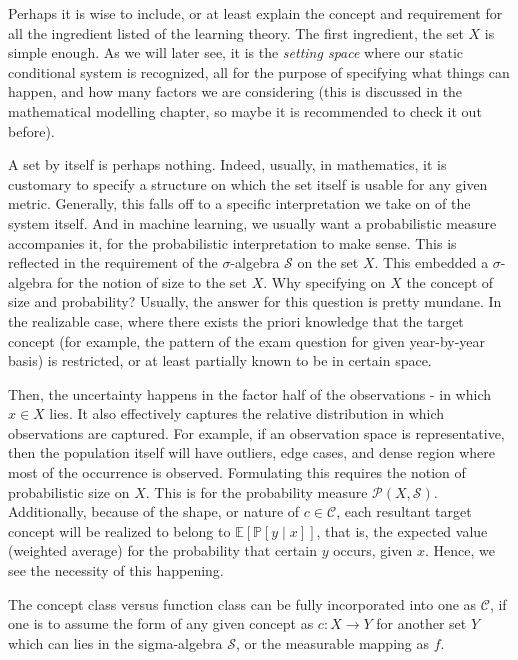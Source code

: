 \begin{note}
    Perhaps it is wise to include, or at least explain the concept and requirement for all the ingredient listed of the learning theory. The first ingredient, the set $X$ is simple enough. As we will later see, it is the \textit{setting space} where our static conditional system is recognized, all for the purpose of specifying what things can happen, and how many factors we are considering (this is discussed in the mathematical modelling chapter, so maybe it is recommended to check it out before). 

    A set by itself is perhaps nothing. Indeed, usually, in mathematics, it is customary to specify a structure on which the set itself is usable for any given metric. Generally, this falls off to a specific interpretation we take on of the system itself. And in machine learning, we usually want a probabilistic measure accompanies it, for the probabilistic interpretation to make sense. This is reflected in the requirement of the $\sigma$-algebra $\mathcal{S}$ on the set $X$. This embedded a $\sigma$-algebra for the notion of size to the set $X$. Why specifying on $X$ the concept of size and probability? Usually, the answer for this question is pretty mundane. In the realizable case, where there exists the priori knowledge that the target concept (for example, the pattern of the exam question for given year-by-year basis) is restricted, or at least partially known to be in certain space. 
    
    Then, the uncertainty happens in the factor half of the observations - in which $x\in X$ lies. It also effectively captures the relative distribution in which observations are captured. For example, if an observation space is representative, then the population itself will have outliers, edge cases, and dense region where most of the occurrence is observed. Formulating this requires the notion of probabilistic size on $X$. This is for the probability measure $\mathcal{P}(X,\mathcal{S})$. Additionally, because of the shape, or nature of $c\in\mathcal{C}$, each resultant target concept will be realized to belong to $\mathbb{E}[\mathbb{P}[y\mid x]]$, that is, the expected value (weighted average) for the probability that certain $y$ occurs, given $x$. Hence, we see the necessity of this happening. 
\end{note}

The concept class versus function class can be fully incorporated into one as $\mathcal{C}$, if one is to assume the form of any given concept as $c: X\to Y$ for another set $Y$ which can lies in the sigma-algebra $\mathcal{S}$, or the measurable mapping as $f$. 

